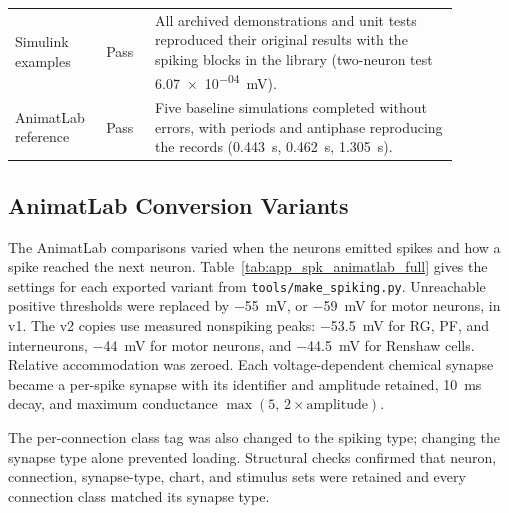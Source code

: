 \begin{table}
\begin{tabular}{@{}>{\raggedright\arraybackslash}p{0.16\linewidth}>{\raggedright\arraybackslash}p{0.10\linewidth}p{0.62\linewidth}@{}}
Simulink examples & Pass & All archived demonstrations and unit tests reproduced their original results with the spiking blocks in the library (two-neuron test \qty{6.07e-04}{\mV}). \\
AnimatLab reference & Pass & Five baseline simulations completed without errors, with periods and antiphase reproducing the records (\qty{0.443}{\second}, \qty{0.462}{\second}, \qty{1.305}{\second}). \\
\bottomrule
\end{tabular}
\end{table}

\subsection{AnimatLab Conversion Variants}

The AnimatLab comparisons varied when the neurons emitted spikes and how a spike reached the next neuron. Table~\ref{tab:app_spk_animatlab_full} gives the settings for each exported variant from \nolinkurl{tools/make_spiking.py}. Unreachable positive thresholds were replaced by \qty{-55}{\mV}, or \qty{-59}{\mV} for motor neurons, in v1. The v2 copies use measured nonspiking peaks: \qty{-53.5}{\mV} for RG, PF, and interneurons, \qty{-44}{\mV} for motor neurons, and \qty{-44.5}{\mV} for Renshaw cells. Relative accommodation was zeroed. Each voltage-dependent chemical synapse became a per-spike synapse with its identifier and amplitude retained, \qty{10}{\ms} decay, and maximum conductance $\max(5,\,2\times\text{amplitude})$.

The per-connection class tag was also changed to the spiking type; changing the synapse type alone prevented loading. Structural checks confirmed that neuron, connection, synapse-type, chart, and stimulus sets were retained and every connection class matched its synapse type.

